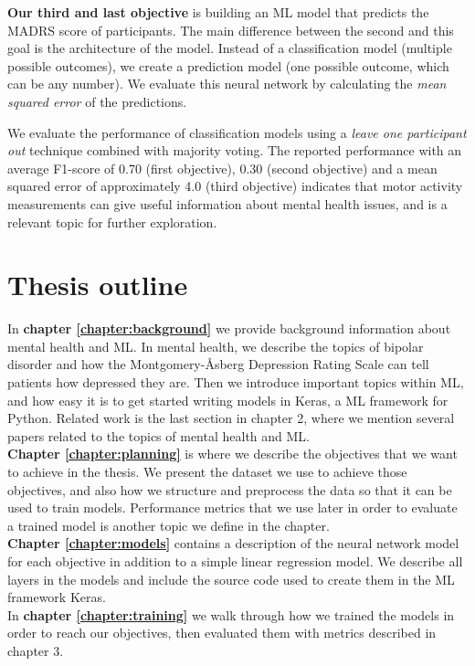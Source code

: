 \textbf{Our third and last objective} is building an ML model that predicts the MADRS score of participants. The main difference between the second and this goal is the architecture of the model. Instead of a classification model (multiple possible outcomes), we create a prediction model (one possible outcome, which can be any number). We evaluate this neural network by calculating the \textit{mean squared error} of the predictions.

We evaluate the performance of classification models using a \textit{leave one participant out} technique combined with majority voting. The reported performance with an average F1-score of 0.70 (first objective), 0.30 (second objective) and a mean squared error of approximately 4.0 (third objective) indicates that motor activity measurements can give useful information about mental health issues, and is a relevant topic for further exploration.

\section{Thesis outline}
In \textbf{chapter \ref{chapter:background}} we provide background information about mental health and ML. In mental health, we describe the topics of bipolar disorder and how the Montgomery-Åsberg Depression Rating Scale can tell patients how depressed they are. Then we introduce important topics within ML, and how easy it is to get started writing models in Keras, a ML framework for Python. Related work is the last section in chapter 2, where we mention several papers related to the topics of mental health and ML. \\

\noindent \textbf{Chapter \ref{chapter:planning}} is where we describe the objectives that we want to achieve in the thesis. We present the dataset we use to achieve those objectives, and also how we structure and preprocess the data so that it can be used to train models. Performance metrics that we use later in order to evaluate a trained model is another topic we define in the chapter.\\

\noindent \textbf{Chapter \ref{chapter:models}} contains a description of the neural network model for each objective in addition to a simple linear regression model. We describe all layers in the models and include the source code used to create them in the ML framework Keras. \\

\noindent In \textbf{chapter \ref{chapter:training}} we walk through how we trained the models in order to reach our objectives, then evaluated them with metrics described in chapter 3. \\

